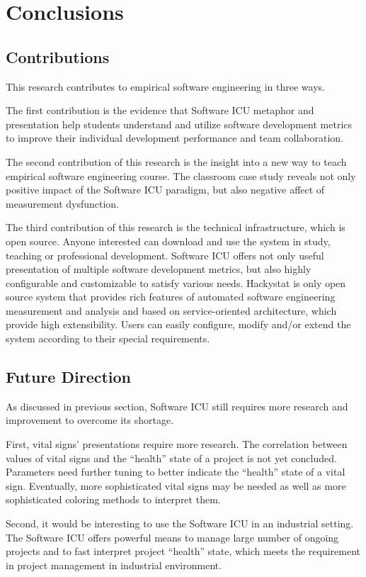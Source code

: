 \chapter{Conclusions}

\section{Contributions}
This research contributes to empirical software engineering in three ways.

The first contribution is the evidence that Software ICU metaphor and presentation help students understand and utilize software development metrics to improve their individual development performance and team collaboration.

The second contribution of this research is the insight into a new way to teach empirical software engineering course. The classroom case study reveals not only positive impact of the Software ICU paradigm, but also negative affect of measurement dysfunction.

The third contribution of this research is the technical infrastructure, which is open source. Anyone interested can download and use the system in study, teaching or professional development. Software ICU offers not only useful presentation of multiple software development metrics, but also highly configurable and customizable to satisfy various needs. Hackystat is only open source system that provides rich features of automated software engineering measurement and analysis and based on service-oriented architecture, which provide high extensibility. Users can easily configure, modify and/or extend the system according to their special requirements.


\section{Future Direction}
As discussed in previous section, Software ICU still requires more research and improvement to overcome its shortage.

First, vital signs' presentations require more research. The correlation between values of vital signs and the ``health'' state of a project is not yet concluded. Parameters need further tuning to better indicate the ``health'' state of a vital sign. Eventually, more sophisticated vital signs may be needed as well as more sophisticated coloring methods to interpret them. 

Second, it would be interesting to use the Software ICU in an industrial setting. The Software ICU offers powerful means to manage large number of ongoing projects and to fast interpret project ``health'' state, which meets the requirement in project management in industrial environment.
 

